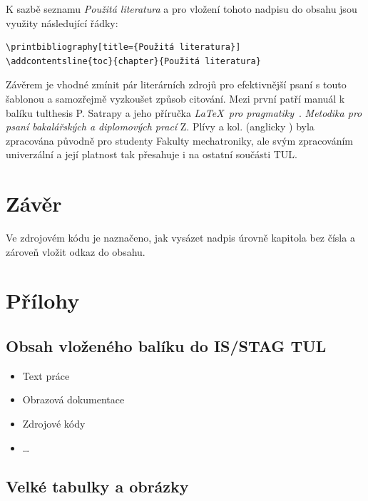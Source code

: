 \documentclass[FM,BP]{tulthesis}
\newcommand{\argument}[1]{{\ttfamily\color{\tulcolor}#1}}
\newenvironment{myquote}{\begin{list}{}{\setlength\leftmargin\parindent}\item[]}{\end{list}}
\newenvironment{listing}{\begin{myquote}\color{\tulcolor}}{\end{myquote}}
\begin{document}
K sazbě seznamu \textit{Použitá literatura} a pro vložení tohoto nadpisu do obsahu jsou využity následující řádky:
\begin{listing}
\begin{verbatim}
\printbibliography[title={Použitá literatura}] 
\addcontentsline{toc}{chapter}{Použitá literatura}     
\end{verbatim}
\end{listing}

Závěrem je vhodné zmínit pár literárních zdrojů pro efektivnější psaní s touto šablonou a samozřejmě vyzkoušet způsob citování. Mezi první patří manuál k balíku \argument{tulthesis} P. Satrapy \cite{Satrapa2022tulthesis} a jeho příručka \textit{\LaTeX\  pro pragmatiky}~\cite{Satrapa2023LatexPragmatiky}. \textit{Metodika pro psaní bakalářských a diplomových prací} Z. Plívy a kol. \cite{Pliva2023DOKcz} (anglicky \cite{Pliva2024DOKen}) byla zpracována původně pro studenty Fakulty mechatroniky, ale svým zpracováním univerzální a její platnost tak přesahuje i na ostatní součásti TUL. 

\chapter*{Závěr}

Ve zdrojovém kódu je naznačeno, jak vysázet nadpis úrovně kapitola bez čísla a zároveň vložit odkaz do obsahu. 

\printbibliography[title={Použitá literatura},heading=bibintoc] %



\renewcommand{\indexname}{Přehled příkazů, prostředí a voleb}
\printindex

\appendix %
\chapter{Přílohy}
\section{Obsah vloženého balíku do IS/STAG TUL} %
\begin{itemize}
    \item Text práce
    \item Obrazová dokumentace
    \item Zdrojové kódy
    \item \dots
\end{itemize}

\section{Velké tabulky a obrázky} %
\end{document}
